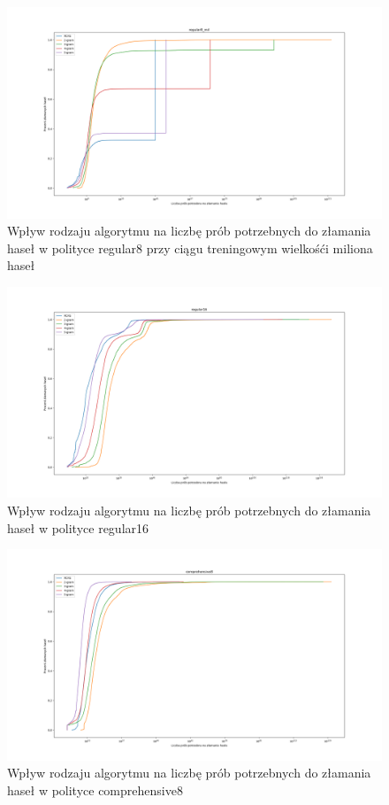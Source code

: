 \documentclass{article}
\begin{document}
	\begin{figure}[H]
		\centering
		\includegraphics[width=15cm, keepaspectratio]{regular8_mil}
		\caption{Wpływ rodzaju algorytmu na liczbę prób potrzebnych do złamania haseł w polityce regular8 przy ciągu treningowym wielkośći miliona haseł}
	\end{figure}

	\begin{figure}[H]
		\centering
		\includegraphics[width=15cm, keepaspectratio]{regular16}
		\caption{Wpływ rodzaju algorytmu na liczbę prób potrzebnych do złamania haseł w polityce regular16}
	\end{figure}

	\begin{figure}[H]
		\centering
		\includegraphics[width=15cm, keepaspectratio]{comprehensive8}
		\caption{Wpływ rodzaju algorytmu na liczbę prób potrzebnych do złamania haseł w polityce comprehensive8}
	\end{figure}
\end{document}
